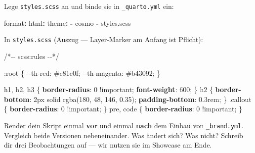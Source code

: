 \documentclass[
  ngerman,
  a4paper,
  DIV=11]{scrreprt}
\newenvironment{Shaded}{\begin{snugshade}}{\end{snugshade}}
\newcommand{\AttributeTok}[1]{\textcolor[rgb]{0.40,0.45,0.13}{#1}}
\newcommand{\CommentTok}[1]{\textcolor[rgb]{0.37,0.37,0.37}{#1}}
\newcommand{\ConstantTok}[1]{\textcolor[rgb]{0.56,0.35,0.01}{#1}}
\newcommand{\DataTypeTok}[1]{\textcolor[rgb]{0.68,0.00,0.00}{#1}}
\newcommand{\DecValTok}[1]{\textcolor[rgb]{0.68,0.00,0.00}{#1}}
\newcommand{\FunctionTok}[1]{\textcolor[rgb]{0.28,0.35,0.67}{#1}}
\newcommand{\InformationTok}[1]{\textcolor[rgb]{0.37,0.37,0.37}{#1}}
\newcommand{\KeywordTok}[1]{\textcolor[rgb]{0.00,0.23,0.31}{\textbf{#1}}}
\newcommand{\NormalTok}[1]{\textcolor[rgb]{0.00,0.23,0.31}{#1}}
\newcommand{\OperatorTok}[1]{\textcolor[rgb]{0.37,0.37,0.37}{#1}}
\newcommand{\VariableTok}[1]{\textcolor[rgb]{0.07,0.07,0.07}{#1}}
\begin{document}
Lege \texttt{styles.scss} an und binde sie in \texttt{\_quarto.yml} ein:

\begin{Shaded}
\begin{Highlighting}[]
\FunctionTok{format}\KeywordTok{:}
\AttributeTok{  }\FunctionTok{html}\KeywordTok{:}
\AttributeTok{    }\FunctionTok{theme}\KeywordTok{:}
\AttributeTok{      }\KeywordTok{{-}}\AttributeTok{ cosmo}
\AttributeTok{      }\KeywordTok{{-}}\AttributeTok{ styles.scss}
\end{Highlighting}
\end{Shaded}

In \texttt{styles.scss} (Auszug --- Layer-Marker am Anfang ist Pflicht):

\begin{Shaded}
\begin{Highlighting}[]
\CommentTok{/*{-}{-} scss:rules {-}{-}*/}

\InformationTok{:root}\NormalTok{ \{}
  \VariableTok{{-}{-}th{-}red}\NormalTok{: }\ConstantTok{\#c81e0f}\OperatorTok{;}
  \VariableTok{{-}{-}th{-}magenta}\NormalTok{: }\ConstantTok{\#b43092}\OperatorTok{;}
\NormalTok{\}}

\NormalTok{h1}\OperatorTok{,}\NormalTok{ h2}\OperatorTok{,}\NormalTok{ h3 \{ }\KeywordTok{border{-}radius}\NormalTok{: }\DecValTok{0} \AttributeTok{!important}\OperatorTok{;} \KeywordTok{font{-}weight}\NormalTok{: }\DecValTok{600}\OperatorTok{;}\NormalTok{ \}}
\NormalTok{h2 \{ }\KeywordTok{border{-}bottom}\NormalTok{: }\DecValTok{2}\DataTypeTok{px} \DecValTok{solid} \FunctionTok{rgba(}\DecValTok{180}\OperatorTok{,} \DecValTok{48}\OperatorTok{,} \DecValTok{146}\OperatorTok{,} \DecValTok{0.35}\FunctionTok{)}\OperatorTok{;} \KeywordTok{padding{-}bottom}\NormalTok{: }\DecValTok{0.3}\DataTypeTok{rem}\OperatorTok{;}\NormalTok{ \}}
\FunctionTok{.callout}\NormalTok{ \{ }\KeywordTok{border{-}radius}\NormalTok{: }\DecValTok{0} \AttributeTok{!important}\OperatorTok{;}\NormalTok{ \}}
\NormalTok{pre}\OperatorTok{,}\NormalTok{ code \{ }\KeywordTok{border{-}radius}\NormalTok{: }\DecValTok{0} \AttributeTok{!important}\OperatorTok{;}\NormalTok{ \}}
\end{Highlighting}
\end{Shaded}

\begin{tcolorbox}[enhanced jigsaw, opacitybacktitle=0.6, leftrule=.75mm, title=\textcolor{quarto-callout-tip-color}{\faLightbulb}\hspace{0.5em}{Mach mit --- Vorher/Nachher}, colframe=quarto-callout-tip-color-frame, arc=.35mm, toprule=.15mm, colbacktitle=quarto-callout-tip-color!10!white, bottomrule=.15mm, colback=white, rightrule=.15mm, breakable, toptitle=1mm, bottomtitle=1mm, opacityback=0, titlerule=0mm, coltitle=black, left=2mm]

Render dein Skript einmal \textbf{vor} und einmal \textbf{nach} dem
Einbau von \texttt{\_brand.yml}. Vergleich beide Versionen
nebeneinander. Was ändert sich? Was nicht? Schreib dir drei
Beobachtungen auf --- wir nutzen sie im Showcase am Ende.

\end{tcolorbox}
\end{document}
